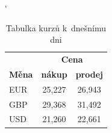 \documentclass[11pt,a4paper]{article}
\begin{document}
\bigskip

\catcode`
\begin{table}[h]
    \centering
	\begin{tabular}{|l|c|c|} \hline
						& \multicolumn{2}{c|}{\textbf{Cena}}	    \\ \cline{2-3}
		\textbf{Měna}	& \textbf{nákup}	    & \textbf{prodej}   \\ \hline
		EUR				& 25,227				& 26,943		    \\
		GBP				& 29,368				& 31,492		    \\
		USD				& 21,260				& 22,661		    \\ \hline
	\end{tabular}
	
\caption{Tabulka kurzů k~dnešnímu dni}
\label{table:1}
\end{table}
	
\bigskip
\end{document}
